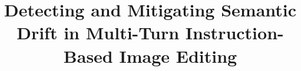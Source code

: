 \title{Detecting and Mitigating Semantic Drift in Multi-Turn Instruction-Based Image Editing}
\author{}
